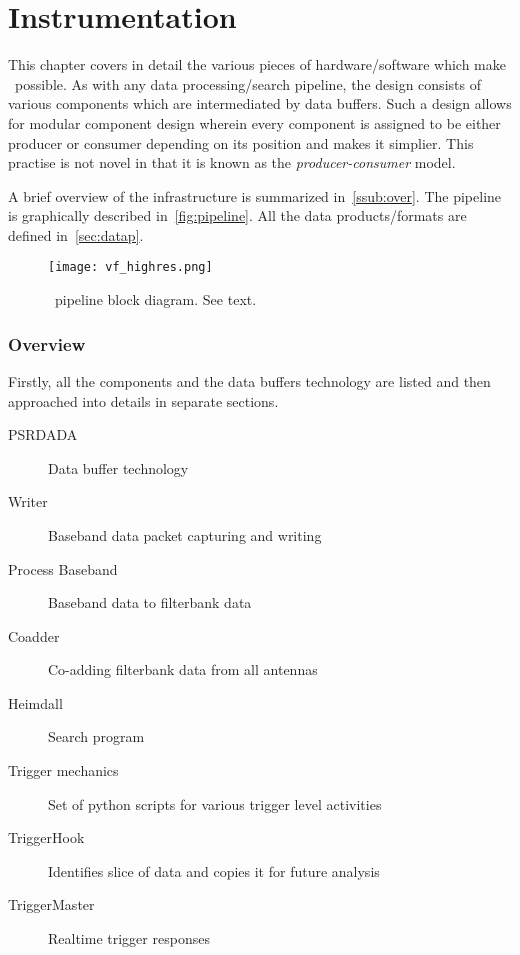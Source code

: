 \chapter{Instrumentation}
\label{ch:inst}

\par This chapter covers in detail the various pieces of hardware/software which make \vf~possible. 
As with any data processing/search pipeline, the design consists of various components which are intermediated by data buffers. 
Such a design allows for modular component design wherein every component is assigned to be either producer or consumer depending on its position and makes it simplier. This practise is not novel in that it is known as the \emph{producer-consumer} model.

\par A brief overview of the infrastructure is summarized in~\autoref{ssub:over}. 
The pipeline is graphically described in~\autoref{fig:pipeline}. All the data products/formats are defined in~\autoref{sec:datap}.


\begin{figure}[ht]
	\label{fig:pipeline}
	\centering
	\texttt{[image: vf\_highres.png]}
	\caption{\vf~pipeline block diagram. See text.}
\end{figure}

\subsection {Overview}
\label{ssub:over}

\par Firstly, all the components and the data buffers technology are listed and then approached into details in separate sections.
\begin{description}
\item[PSRDADA] Data buffer technology
\item[Writer]  Baseband data packet capturing and writing
\item[Process Baseband] Baseband data to filterbank data
\item[Coadder] Co-adding filterbank data from all antennas
\item[Heimdall] Search program 
\item[Trigger mechanics] Set of python scripts for various trigger level activities
\item[TriggerHook]   Identifies slice of data and copies it for future analysis
\item[TriggerMaster] Realtime trigger responses
\end{description}

